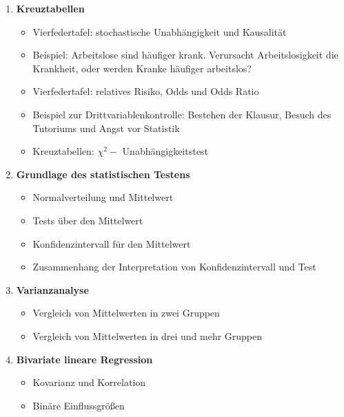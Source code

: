 \documentclass[a4paper,fontsize=13pt]{scrartcl}
\begin{document}
\begin{enumerate}
      \item{\textbf{Kreuztabellen}
     \begin{itemize}
          \item{Vierfedertafel: stochastische Unabhängigkeit und Kausalität} %
          \item{Beispiel: Arbeitslose sind häufiger krank. Verursacht Arbeitslosigkeit die Krankheit, oder
              werden Kranke häufiger arbeitslos?}
          \item{Vierfedertafel: relatives Risiko, Odds und Odds Ratio}
          \item{Beispiel zur Drittvariablenkontrolle: Bestehen der Klausur, Besuch
          des Tutoriums und Angst vor Statistik}
          \item{Kreuztabellen: $\chi^{2}-$ Unabhängigkeitstest}%
     \end{itemize}
   }
  
     
     \item{\textbf{Grundlage des statistischen Testens }
     \begin{itemize}
       \item{Normalverteilung und Mittelwert}
       \item{Tests über den Mittelwert}
       \item{Konfidenzintervall für den Mittelwert }
       \item{Zusammenhang der Interpretation von Konfidenzintervall und Test}
     \end{itemize}
   }
     
      \item{\textbf{Varianzanalyse}
    \begin{itemize}
      \item{Vergleich von Mittelwerten in zwei Gruppen}
      \item{Vergleich von Mittelwerten in drei und mehr Gruppen}
    \end{itemize}
  }
  
   \item{\textbf{Bivariate lineare Regression}
     \begin{itemize}
          \item{Kovarianz und Korrelation} %
          \item{Binäre Einflussgrößen}
     \end{itemize}
   }
   

\end{enumerate}
\end{document}
